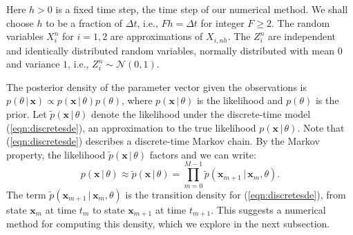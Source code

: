 \documentclass[graybox]{svmult}
\begin{document}
Here $h > 0$ is a fixed time step, the time step of our numerical method.  We shall choose $h$ to be a fraction of $\Delta t$, i.e., $F h = \Delta t$ for integer $F \geq 2$.  The random variables $X_i^n$ for $i=1,2$ are approximations of $X_{i,n h}$.  The $Z_i^n$ are independent and identically distributed random variables, normally distributed with mean $0$ and variance $1$, i.e., $Z_i^n \sim \mathcal{N}(0,1)$.

The posterior density of the parameter vector given the observations is $p(\theta \, | \, \mathbf{x})  \propto p( \mathbf{x} \, | \, \theta)  p(\theta)$, where $p( \mathbf{x} \, | \, \theta)$ is the likelihood and $p(\theta)$ is the prior.  Let $\widetilde{p}(\mathbf{x} \, | \, \theta)$ denote the likelihood under the discrete-time model (\ref{eqn:discretesde}), an approximation to the true likelihood $p(\mathbf{x} \, | \, \theta)$.  Note that (\ref{eqn:discretesde}) describes a discrete-time Markov chain.  By the Markov property, the likelihood $\widetilde{p}(\mathbf{x} \, | \, \theta)$ factors and we can write:
\begin{equation}
\label{eqn:markovfactor}
p(\mathbf{x} \, | \, \theta) \approx \widetilde{p}(\mathbf{x} \, | \, \theta) = \prod_{m=0}^{M-1} \widetilde{p}(\mathbf{x}_{m+1} \, | \, \mathbf{x}_m, \theta).
\end{equation}
The term $\widetilde{p}(\mathbf{x}_{m+1} \, | \, \mathbf{x}_m, \theta)$ is the transition density for (\ref{eqn:discretesde}), from state $\mathbf{x}_m$ at time $t_m$ to state $\mathbf{x}_{m+1}$ at time $t_{m+1}$.  This suggests a numerical method for computing this density, which we explore in the next subsection.
 
\end{document}
